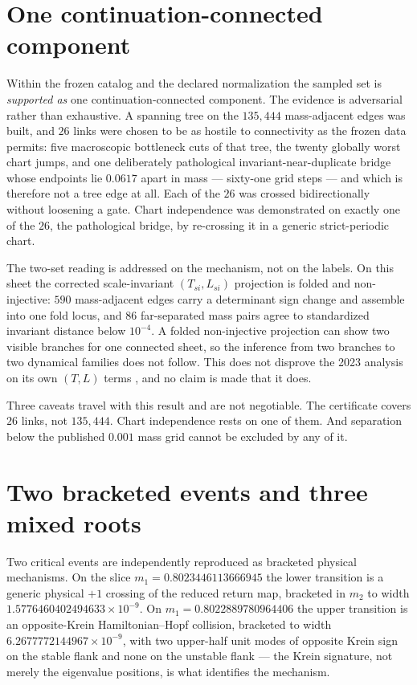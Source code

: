 \documentclass[11pt]{article}
\begin{document}
\section{One continuation-connected component}

Within the frozen catalog and the declared normalization the sampled set is \emph{supported as} one
continuation-connected component. The evidence is adversarial rather than exhaustive. A spanning tree
on the $135{,}444$ mass-adjacent edges was built, and $26$ links were chosen to be as hostile to
connectivity as the frozen data permits: five macroscopic bottleneck cuts of that tree, the twenty
globally worst chart jumps, and one deliberately pathological invariant-near-duplicate bridge whose
endpoints lie $0.0617$ apart in mass --- sixty-one grid steps --- and which is therefore not a tree
edge at all. Each of the $26$ was crossed bidirectionally without loosening a gate. Chart
independence was demonstrated on exactly one of the $26$, the pathological bridge, by re-crossing it
in a generic strict-periodic chart.

The two-set reading is addressed on the mechanism, not on the labels. On this sheet the corrected
scale-invariant $(T_{si},L_{si})$ projection is folded and non-injective: $590$ mass-adjacent edges
carry a determinant sign change and assemble into one fold locus, and $86$ far-separated mass pairs
agree to standardized invariant distance below $10^{-4}$. A folded non-injective projection can show
two visible branches for one connected sheet, so the inference from two branches to two dynamical
families does not follow. This does not disprove the 2023 analysis on its own $(T,L)$ terms
\cite{stancevic2023moth}, and no claim is made that it does.

Three caveats travel with this result and are not negotiable. The certificate covers $26$ links, not
$135{,}444$. Chart independence rests on one of them. And separation below the published $0.001$ mass
grid cannot be excluded by any of it.

\section{Two bracketed events and three mixed roots}

Two critical events are independently reproduced as bracketed physical mechanisms. On the slice
$m_1=0.8023446113666945$ the lower transition is a generic physical $+1$ crossing of the reduced
return map, bracketed in $m_2$ to width $1.5776460402494633\times10^{-9}$. On
$m_1=0.8022889780964406$ the upper transition is an opposite-Krein Hamiltonian--Hopf collision,
bracketed to width $6.2677772144967\times10^{-9}$, with two upper-half unit modes of opposite Krein
sign on the stable flank and none on the unstable flank --- the Krein signature, not merely the
eigenvalue positions, is what identifies the mechanism.
\end{document}
